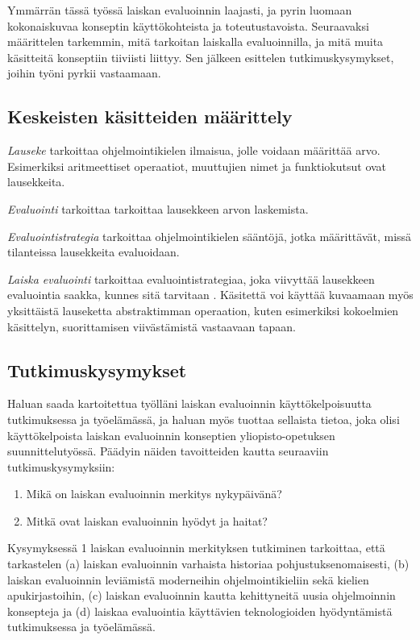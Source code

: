 Ymmärrän tässä työssä laiskan evaluoinnin laajasti, ja pyrin luomaan kokonaiskuvaa konseptin käyttökohteista ja toteutustavoista.  Seuraavaksi määrittelen tarkemmin, mitä tarkoitan laiskalla evaluoinnilla, ja mitä muita käsitteitä konseptiin tiiviisti liittyy. Sen jälkeen esittelen tutkimuskysymykset, joihin työni pyrkii vastaamaan.

\subsection{Keskeisten käsitteiden määrittely}

\textit{Lauseke} tarkoittaa ohjelmointikielen ilmaisua, jolle voidaan määrittää arvo. Esimerkiksi aritmeettiset operaatiot, muuttujien nimet ja funktiokutsut ovat lausekkeita.

\textit{Evaluointi} tarkoittaa tarkoittaa lausekkeen arvon laskemista.

\textit{Evaluointistrategia} tarkoittaa ohjelmointikielen sääntöjä, jotka määrittävät, missä tilanteissa lausekkeita evaluoidaan.

\textit{Laiska evaluointi} tarkoittaa evaluointistrategiaa, joka viivyttää lausekkeen evaluointia saakka, kunnes sitä tarvitaan \citep{watt2004programming}. Käsitettä voi käyttää kuvaamaan myös yksittäistä lauseketta abstraktimman operaation, kuten esimerkiksi kokoelmien käsittelyn, suorittamisen viivästämistä vastaavaan tapaan.

\subsection{Tutkimuskysymykset}

Haluan saada kartoitettua työlläni laiskan evaluoinnin käyttökelpoisuutta tutkimuksessa ja työelämässä, ja haluan myös tuottaa sellaista tietoa, joka olisi käyttökelpoista laiskan evaluoinnin konseptien yliopisto-opetuksen suunnittelutyössä. Päädyin näiden tavoitteiden kautta seuraaviin tutkimuskysymyksiin:
\begin{enumerate}
  \item{Mikä on laiskan evaluoinnin merkitys nykypäivänä?}
  \item{Mitkä ovat laiskan evaluoinnin hyödyt ja haitat?}
\end{enumerate}

Kysymyksessä 1 laiskan evaluoinnin merkityksen tutkiminen tarkoittaa, että tarkastelen (a) laiskan evaluoinnin varhaista historiaa pohjustuksenomaisesti, (b) laiskan evaluoinnin leviämistä moderneihin ohjelmointikieliin sekä kielien apukirjastoihin, (c) laiskan evaluoinnin kautta kehittyneitä uusia ohjelmoinnin konsepteja ja (d) laiskaa evaluointia käyttävien teknologioiden hyödyntämistä tutkimuksessa ja työelämässä.


